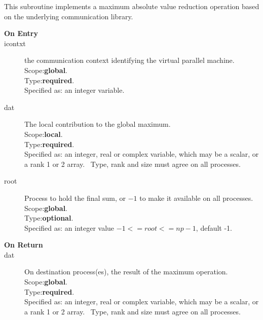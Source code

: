 This subroutine implements a maximum absolute value reduction
operation based on the underlying communication library. 
\begin{description}
\item[\bf  On Entry ]
\item[icontxt] the communication context identifying the virtual
  parallel machine.\\
Scope:{\bf global}.\\
Type:{\bf required}.\\
Specified as: an integer variable.
\item[dat] The local contribution to the global maximum.\\
Scope:{\bf local}.\\
Type:{\bf required}.\\
Specified as: an integer, real or complex variable, which may be a
scalar, or a rank 1 or 2 array. \
Type, rank and size must agree on all processes.
\item[root] Process to hold the final sum, or $-1$ to make it available
  on all processes.\\
Scope:{\bf global}.\\
Type:{\bf optional}.\\
Specified as: an integer value $-1<= root <= np-1$, default -1. \\
\end{description}


\begin{description}
\item[\bf On Return]
\item[dat] On destination process(es), the result of the maximum operation.\\
Scope:{\bf global}.\\
Type:{\bf required}.\\
Specified as: an integer, real or complex variable, which may be a
scalar, or a rank 1 or 2 array. \
Type, rank and size must agree on all processes.
\end{description}




